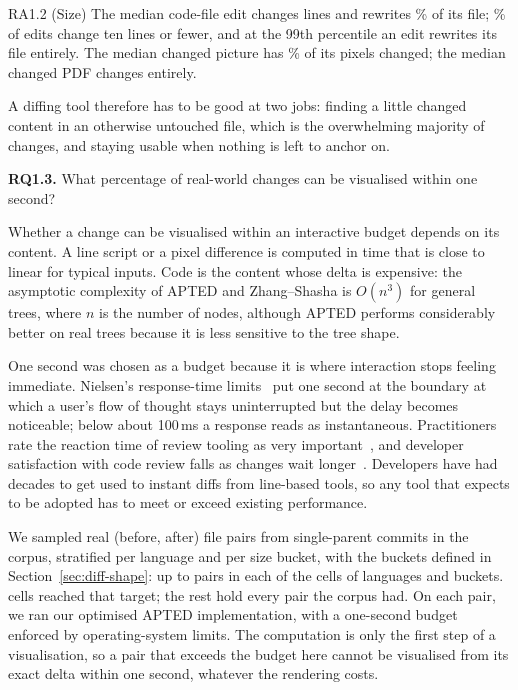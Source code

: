 \documentclass[sigconf,review]{acmart}
\begin{document}
\begin{resultbox}{RA1.2 (Size)}
  The median code-file edit changes \EditsLinesPerFilePFifty{} lines and rewrites
  \EditsChurnPFiftyPct{}\% of its file; \EditsFileEditsUnderTenPct{}\% of edits change ten lines
  or fewer, and at the 99th percentile an edit rewrites its file entirely. The median changed
  picture has \ContentSizePicturesSharePFiftyPct{}\% of its pixels changed; the median changed
  PDF changes entirely.
\end{resultbox}

A diffing tool therefore has to be good at two jobs: finding a little changed content in an
otherwise untouched file, which is the overwhelming majority of changes, and staying usable
when nothing is left to anchor on.

\textbf{RQ1.3.} What percentage of real-world changes can be visualised within one second?
\label{sec:speed}

Whether a change can be visualised within an interactive budget depends on its content. A line
script or a pixel difference is computed in time that is close to linear for typical inputs. Code
is the content whose delta is expensive: the asymptotic complexity of APTED and Zhang--Shasha is
$O(n^3)$ for general trees, where $n$ is the number of nodes, although APTED performs considerably
better on real trees because it is less sensitive to the tree shape.

One second was chosen as a budget because it is where interaction stops feeling immediate.
Nielsen's response-time limits~\cite{nielsen-usability} put one second at the boundary at which a
user's flow of thought stays uninterrupted but the delay becomes noticeable; below about 100\,ms
a response reads as instantaneous. Practitioners rate the reaction time of review tooling as very
important~\cite{kudrjavets-2023}, and developer satisfaction with code review falls as changes
wait longer~\cite{meta-review-time-2022}. Developers have had decades to get used to instant
diffs from line-based tools, so any tool that expects to be adopted has to meet or exceed existing performance.

We sampled \RqOnePairsAttempted{} real (before, after) file pairs from single-parent commits in
the corpus, stratified per language and per size bucket, with the buckets defined in
Section~\ref{sec:diff-shape}: up to \RqOnePerCell{} pairs in each of the \RqOneCells{} cells of
\RqOneLanguages{} languages and \RqOneBuckets{} buckets. \RqOneFullCells{} cells reached that
target; the rest hold every pair the corpus had. On each pair, we ran our optimised APTED
implementation, with a one-second budget enforced by operating-system limits. The computation is
only the first step of a visualisation, so a pair that exceeds the budget here cannot be
visualised from its exact delta within one second, whatever the rendering costs.
\end{document}
